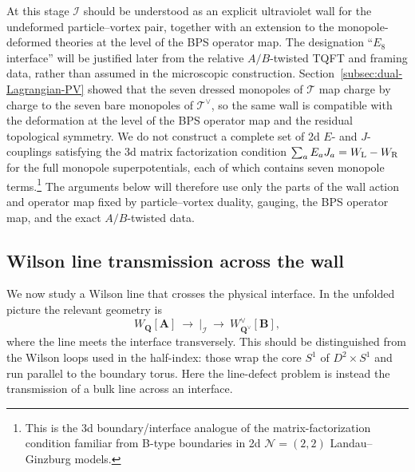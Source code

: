 \documentclass[11pt,a4paper]{article}
\numberwithin{equation}{section}
\begin{document}
At this stage $\mathcal I$ should be understood as an explicit ultraviolet wall for the undeformed particle--vortex pair, together with an extension to the monopole-deformed theories at the level of the BPS operator map.  The designation ``$E_8$ interface'' will be justified later from the relative $A/B$-twisted TQFT and framing data, rather than assumed in the microscopic construction.  Section~\ref{subsec:dual-Lagrangian-PV} showed that the seven dressed monopoles of $\mathcal T$ map charge by charge to the seven bare monopoles of $\mathcal T^\vee$, so the same wall is compatible with the deformation at the level of the BPS operator map and the residual topological symmetry.  We do not construct a complete set of 2d $E$- and $J$-couplings satisfying the 3d matrix factorization condition $\sum_a E_aJ_a=W_{\rm L}-W_{\rm R}$ for the full monopole superpotentials, each of which contains seven monopole terms.\footnote{This is the 3d boundary/interface analogue of the matrix-factorization condition familiar from B-type boundaries in 2d $\mathcal N=(2,2)$ Landau--Ginzburg models.}  The arguments below will therefore use only the parts of the wall action and operator map fixed by particle--vortex duality, gauging, the BPS operator map, and the exact $A/B$-twisted data.


\subsection{Wilson line transmission across the wall}
\label{subsec:interface-Wilson-transmission}

We now study a Wilson line that crosses the physical interface.  In the unfolded picture the relevant geometry is
\[
  W_{\boldsymbol Q}[\boldsymbol A]
  \ \longrightarrow\ 
  \Big|_{\mathcal I}
  \ \longrightarrow\ 
  W_{\boldsymbol Q^\vee}^{\vee}[\boldsymbol B],
\]
where the line meets the interface transversely.  This should be distinguished from the Wilson loops used in the half-index: those wrap the core $S^1$ of $D^2\times S^1$ and run parallel to the boundary torus.  Here the line-defect problem is instead the transmission of a bulk line across an interface.
\end{document}
